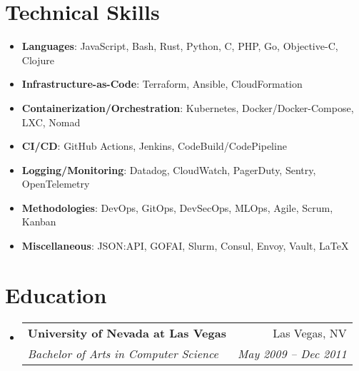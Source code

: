 \documentclass[letterpaper,11pt]{article}
\makeatletter
\newcommand{\resumeSubheading}[4]{
  \vspace{-2pt}\item
    \begin{tabular*}{0.97\textwidth}[t]{l@{\extracolsep{\fill}}r}
      \textbf{#1} & #2 \\
      \textit{\small#3} & \textit{\small #4} \\
    \end{tabular*}\vspace{-7pt}
}
\newcommand{\resumeSubHeadingListStart}{\begin{itemize}[leftmargin=0.15in, label={}]}
\newcommand{\resumeSubHeadingListEnd}{\end{itemize}}
\newenvironment{resumeListicle}{
    \small        %
    \setlength{\itemsep}{0pt}
    \setlength{\parskip}{0pt}
}{}
\newcommand{\resumeListicleStart}{\begin{resumeListicle}}
\newcommand{\resumeListicleEnd}{\end{resumeListicle}}
\newcommand{\resumeListicleItem}[2]{%
  \item \textbf{#1}: #2%
}
\makeatother
\begin{document}
\section{Technical Skills}
  \resumeSubHeadingListStart
    \resumeListicleStart
      \resumeListicleItem{Languages}{JavaScript, Bash, Rust, Python, C, PHP, Go, Objective-C, Clojure } \\
      \resumeListicleItem{Infrastructure-as-Code}{Terraform, Ansible, CloudFormation } \\
      \resumeListicleItem{Containerization/Orchestration}{Kubernetes, Docker/Docker-Compose, LXC, Nomad } \\
      \resumeListicleItem{CI/CD}{GitHub Actions, Jenkins, CodeBuild/CodePipeline } \\
      \resumeListicleItem{Logging/Monitoring}{Datadog, CloudWatch, PagerDuty, Sentry, OpenTelemetry } \\
      \resumeListicleItem{Methodologies}{DevOps, GitOps, DevSecOps, MLOps, Agile, Scrum, Kanban } \\
      \resumeListicleItem{Miscellaneous}{JSON:API, GOFAI, Slurm, Consul, Envoy, Vault, \LaTeX{} } \\
    \resumeListicleEnd
  \resumeSubHeadingListEnd

\section{Education}
  \resumeSubHeadingListStart
    \resumeSubheading
      {University of Nevada at Las Vegas}{Las Vegas, NV}
      {Bachelor of Arts in Computer Science}{May 2009 – Dec 2011}
  \resumeSubHeadingListEnd

\end{document}
